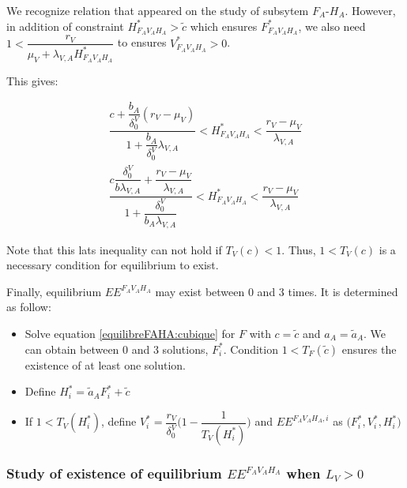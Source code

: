 \documentclass{article}
\newcommand{\lva}{\lambda_{V, A}}
\newcommand{\dv}{\delta_0^V}
\begin{document}
We recognize relation that appeared on the study of subsytem $F_A$-$H_A$. However, in addition of constraint $H^*_{F_AV_AH_A} > \tilde{c}$ which ensures $F^*_{F_AV_AH_A}$, we also need $1 < \dfrac{r_V}{\mu_V + \lva H^*_{F_AV_AH_A}}$ to ensures $V^*_{F_AV_AH_A} > 0$.

This gives:

\begin{align*}
\dfrac{c +\dfrac{b_A}{\dv} (r_V - \mu_V)}{1 + \dfrac{b_A}{\dv}\lva} < H^*_{F_AV_AH_A} < \dfrac{r_V - \mu_V}{\lva} \\
\dfrac{c \dfrac{\dv}{b \lva} +\dfrac{r_V - \mu_V}{\lva}}{1 + \dfrac{\dv}{b_A \lva}} < H^*_{F_AV_AH_A} < \dfrac{r_V - \mu_V}{\lva}
\end{align*}


Note that this lats inequality can not hold if $T_V(c) < 1$. Thus, $1 < T_V(c)$ is a necessary condition for equilibrium to exist.


Finally, equilibrium $EE^{F_AV_AH_A}$ may exist between 0 and 3 times. It is determined as follow:
\begin{itemize}
\item Solve equation \eqref{equilibreFAHA:cubique} for $F$ with $c = \tilde{c}$ and $a_A = \tilde{a}_A$. We can obtain between 0 and 3 solutions, $F^*_i$. Condition $1 < T_F(\tilde{c})$ ensures the existence of at least one solution.
\item Define $H^*_i =  \tilde{a}_A F^*_i + \tilde{c}$
\item If $1 < T_V(H^*_i)$, define $V^*_i = \dfrac{r_V}{\dv}\Big(1 - \dfrac{1}{T_V(H^*_i)} \Big) $ and $EE^{F_AV_AH_A, i}$ as $\Big(F^*_i, V^*_i, H^*_i \Big)$
\end{itemize}

\newpage

\subsubsection{Study of existence of equilibrium $EE^{F_AV_AH_A}$ when $L_V > 0$}
\end{document}
